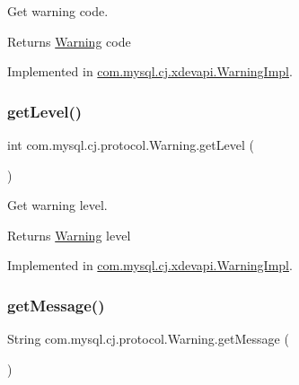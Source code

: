 Get warning code.

\begin{DoxyReturn}{Returns}
\mbox{\hyperlink{interfacecom_1_1mysql_1_1cj_1_1protocol_1_1_warning}{Warning}} code 
\end{DoxyReturn}


Implemented in \mbox{\hyperlink{classcom_1_1mysql_1_1cj_1_1xdevapi_1_1_warning_impl_a4e36aba92d49db5855897c8a26ffce06}{com.\+mysql.\+cj.\+xdevapi.\+Warning\+Impl}}.

\mbox{\label{interfacecom_1_1mysql_1_1cj_1_1protocol_1_1_warning_a37396ddf66dbd9e7cd386825e0a47966}} 
\subsubsection{\texorpdfstring{get\+Level()}{getLevel()}}
{\footnotesize\ttfamily int com.\+mysql.\+cj.\+protocol.\+Warning.\+get\+Level (\begin{DoxyParamCaption}{ }\end{DoxyParamCaption})}

Get warning level.

\begin{DoxyReturn}{Returns}
\mbox{\hyperlink{interfacecom_1_1mysql_1_1cj_1_1protocol_1_1_warning}{Warning}} level 
\end{DoxyReturn}


Implemented in \mbox{\hyperlink{classcom_1_1mysql_1_1cj_1_1xdevapi_1_1_warning_impl_abc0fcf3e60763b3d3ce1b7126be22f61}{com.\+mysql.\+cj.\+xdevapi.\+Warning\+Impl}}.

\mbox{\label{interfacecom_1_1mysql_1_1cj_1_1protocol_1_1_warning_ae984bc89101642345d59a9dac4b32782}} 
\subsubsection{\texorpdfstring{get\+Message()}{getMessage()}}
{\footnotesize\ttfamily String com.\+mysql.\+cj.\+protocol.\+Warning.\+get\+Message (\begin{DoxyParamCaption}{ }\end{DoxyParamCaption})}

